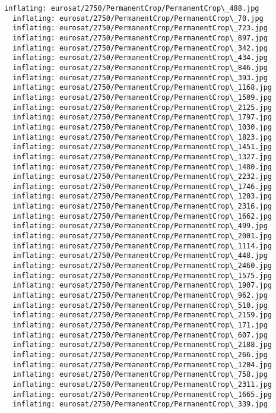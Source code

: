 \documentclass[11pt]{article}
\begin{document}
\begin{Verbatim}[commandchars=\\\{\}]
  inflating: eurosat/2750/PermanentCrop/PermanentCrop\_488.jpg
  inflating: eurosat/2750/PermanentCrop/PermanentCrop\_70.jpg
  inflating: eurosat/2750/PermanentCrop/PermanentCrop\_723.jpg
  inflating: eurosat/2750/PermanentCrop/PermanentCrop\_897.jpg
  inflating: eurosat/2750/PermanentCrop/PermanentCrop\_342.jpg
  inflating: eurosat/2750/PermanentCrop/PermanentCrop\_434.jpg
  inflating: eurosat/2750/PermanentCrop/PermanentCrop\_846.jpg
  inflating: eurosat/2750/PermanentCrop/PermanentCrop\_393.jpg
  inflating: eurosat/2750/PermanentCrop/PermanentCrop\_1168.jpg
  inflating: eurosat/2750/PermanentCrop/PermanentCrop\_1509.jpg
  inflating: eurosat/2750/PermanentCrop/PermanentCrop\_2125.jpg
  inflating: eurosat/2750/PermanentCrop/PermanentCrop\_1797.jpg
  inflating: eurosat/2750/PermanentCrop/PermanentCrop\_1030.jpg
  inflating: eurosat/2750/PermanentCrop/PermanentCrop\_1823.jpg
  inflating: eurosat/2750/PermanentCrop/PermanentCrop\_1451.jpg
  inflating: eurosat/2750/PermanentCrop/PermanentCrop\_1327.jpg
  inflating: eurosat/2750/PermanentCrop/PermanentCrop\_1480.jpg
  inflating: eurosat/2750/PermanentCrop/PermanentCrop\_2232.jpg
  inflating: eurosat/2750/PermanentCrop/PermanentCrop\_1746.jpg
  inflating: eurosat/2750/PermanentCrop/PermanentCrop\_1203.jpg
  inflating: eurosat/2750/PermanentCrop/PermanentCrop\_2316.jpg
  inflating: eurosat/2750/PermanentCrop/PermanentCrop\_1662.jpg
  inflating: eurosat/2750/PermanentCrop/PermanentCrop\_499.jpg
  inflating: eurosat/2750/PermanentCrop/PermanentCrop\_2001.jpg
  inflating: eurosat/2750/PermanentCrop/PermanentCrop\_1114.jpg
  inflating: eurosat/2750/PermanentCrop/PermanentCrop\_448.jpg
  inflating: eurosat/2750/PermanentCrop/PermanentCrop\_2460.jpg
  inflating: eurosat/2750/PermanentCrop/PermanentCrop\_1575.jpg
  inflating: eurosat/2750/PermanentCrop/PermanentCrop\_1907.jpg
  inflating: eurosat/2750/PermanentCrop/PermanentCrop\_962.jpg
  inflating: eurosat/2750/PermanentCrop/PermanentCrop\_510.jpg
  inflating: eurosat/2750/PermanentCrop/PermanentCrop\_2159.jpg
  inflating: eurosat/2750/PermanentCrop/PermanentCrop\_171.jpg
  inflating: eurosat/2750/PermanentCrop/PermanentCrop\_607.jpg
  inflating: eurosat/2750/PermanentCrop/PermanentCrop\_2188.jpg
  inflating: eurosat/2750/PermanentCrop/PermanentCrop\_266.jpg
  inflating: eurosat/2750/PermanentCrop/PermanentCrop\_1204.jpg
  inflating: eurosat/2750/PermanentCrop/PermanentCrop\_758.jpg
  inflating: eurosat/2750/PermanentCrop/PermanentCrop\_2311.jpg
  inflating: eurosat/2750/PermanentCrop/PermanentCrop\_1665.jpg
  inflating: eurosat/2750/PermanentCrop/PermanentCrop\_339.jpg

\end{Verbatim}
\end{document}
